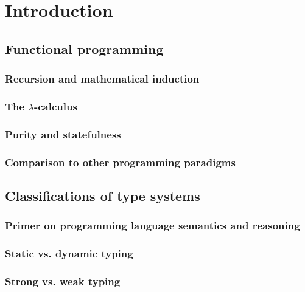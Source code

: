 \section{Introduction}
\label{sec:introduction}

\subsection{Functional programming}
\label{sec:fp}

\subsubsection{Recursion and mathematical induction}
\label{sec:recursion}

\subsubsection{The $\lambda$-calculus}
\label{sec:lambda_calculus}

\subsubsection{Purity and statefulness}
\label{sec:purity}

\subsubsection{Comparison to other programming paradigms}
\label{sec:fp_comp}

\subsection{Classifications of type systems}
\label{sec:ts_classifications}

\subsubsection{Primer on programming language semantics and reasoning}
\label{sec:pl_semantics}

\subsubsection{Static vs. dynamic typing}
\label{sec:staticness}

\subsubsection{Strong vs. weak typing}
\label{sec:strength}

